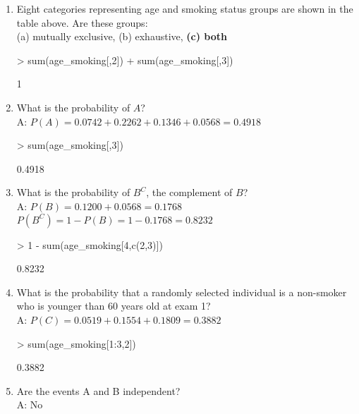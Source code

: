 \documentclass{article}
\begin{document}
\begin{enumerate}
\item 
Eight categories representing age and smoking status groups are shown in the table above. Are these groups:\\
(a) mutually exclusive, (b) exhaustive, \textbf{(c) both}

\begin{Schunk}
\begin{Sinput}
> sum(age_smoking[,2]) + sum(age_smoking[,3])
\end{Sinput}
\begin{Soutput}
[1] 1
\end{Soutput}
\end{Schunk}

\item What is the probability of \(A\)?\\
A: \(P(A)=0.0742+0.2262+0.1346+0.0568=0.4918\)

\begin{Schunk}
\begin{Sinput}
> sum(age_smoking[,3])
\end{Sinput}
\begin{Soutput}
[1] 0.4918
\end{Soutput}
\end{Schunk}


\item What is the probability of \(B^C\), the complement of \(B\)?\\
A: \(P(B)=0.1200 + 0.0568=0.1768\)\\
\(P(B^C)=1-P(B)=1-0.1768=0.8232\)

\begin{Schunk}
\begin{Sinput}
> 1 - sum(age_smoking[4,c(2,3)])
\end{Sinput}
\begin{Soutput}
[1] 0.8232
\end{Soutput}
\end{Schunk}


\item What is the probability that a randomly selected individual is a non-smoker who is younger than 60 years old at exam 1?\\
A: \(P(C)=0.0519+0.1554+0.1809=0.3882\)

\begin{Schunk}
\begin{Sinput}
> sum(age_smoking[1:3,2])
\end{Sinput}
\begin{Soutput}
[1] 0.3882
\end{Soutput}
\end{Schunk}


\item Are the events A and B independent?\\
A: No
\end{enumerate}
\pagebreak
\end{document}
